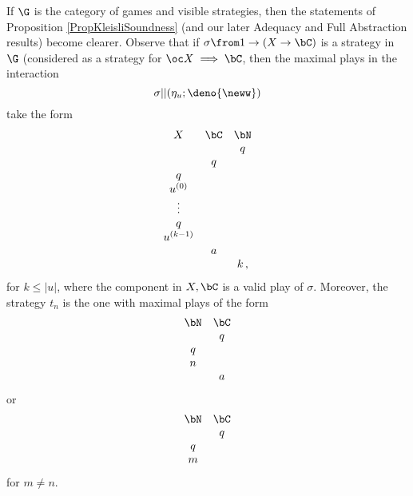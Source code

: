 If $\G$ is the category of games and visible strategies, then the statements of Proposition \ref{PropKleisliSoundness} (and our later Adequacy and Full Abstraction results) become clearer.  
Observe that if $\sigma \from 1 \to (X \to \bC)$ is a strategy in $\G$ (considered as a strategy for $\oc X \implies \bC$, then the maximal plays in the interaction
\[
  \sigma || (\eta_u;\deno{\neww})
  \]
take the form
\[
  \begin{array}{ccc}
    X         & \bC & \bN \\
              &     &  q  \\
              &  q  &     \\
    q         &     &     \\
    u^{(0)}   &     &     \\
    \vdots    &     &     \\
    q         &     &     \\
    u^{(k-1)} &     &     \\
              &  a  &     \\
              &     &  {k\,,}  \\
  \end{array}
  \]
for $k\le |u|$, where the component in $X,\bC$ is a valid play of $\sigma$.
Moreover, the strategy $t_n$ is the one with maximal plays of the form
\[
  \begin{array}{cc}
    \bN & \bC \\
        &  q  \\
    q   &     \\
    n   &     \\
        &  a
  \end{array}
  \]
or
\[
  \begin{array}{cc}
    \bN & \bC \\
        &  q  \\
    q   &     \\
    m   &
  \end{array}
  \]
for $m\ne n$.

